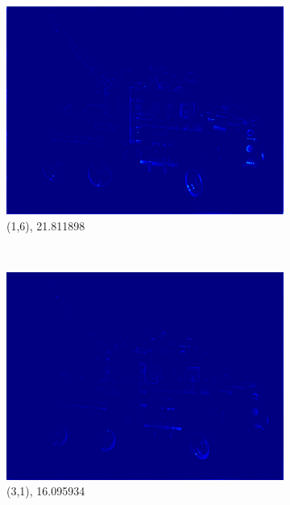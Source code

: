 \documentclass[11pt,a4paper,titlepage]{article}
\begin{document}
\begin{figure}
\begin{subfigure}[t]{0.31\textwidth}
		\includegraphics[width=\textwidth]{results/tiles_legotruck_6x6x480x640_480x640x5_tiling_4x6x200x200_overlap_0.5/MSE_for_view_(1,6).png}
		\caption{(1,6), 21.811898}
	\end{subfigure}%
	\\
	\begin{subfigure}[t]{0.31\textwidth}
		\includegraphics[width=\textwidth]{results/tiles_legotruck_6x6x480x640_480x640x5_tiling_4x6x200x200_overlap_0.5/MSE_for_view_(3,1).png}
		\caption{(3,1), 16.095934}
	\end{subfigure}%
	~
	\begin{subfigure}[t]{0.31\textwidth}

\end{subfigure}
\end{figure}
\end{document}
